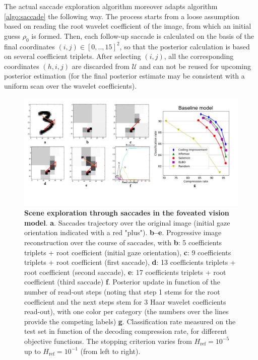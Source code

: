 \documentclass[12pt,twoside,openright]{article}
\begin{document}
The actual saccade exploration algorithm moreover adapts algorithm \ref{algo:saccade} the following way. The process starts from a loose assumption based on reading the root wavelet coefficient of the image, from which an initial guess $\rho_0$ is formed. Then, each follow-up saccade is calculated on the basis of the final coordinates $(i,j) \in [0,..,15]^2$, so that the posterior calculation is based on several coefficient triplets. After selecting $(i,j)$, all the corresponding coordinates $(h,i,j)$ are discarded from $\mathcal{U}$ and can not be reused for upcoming posterior estimation (for the final posterior estimate may be consistent with a uniform scan over the wavelet coefficients). 

\begin{figure}[b!]
	\centerline{
		\includegraphics[width=\linewidth]{img/NIPS-saccade.pdf}}
	\vspace{-.2cm}
	\caption{\textbf{Scene exploration through saccades in the foveated vision model}. \textbf{a}. Saccades trajectory over the original image (initial gaze orientation indicated with a red "plus"). \textbf{b--e}. Progressive image reconstruction over the course of saccades, with \textbf{b}: 5 coefficients triplets + root coefficient (initial gaze orientation), \textbf{c}: 9 coefficients triplets + root coefficient (first saccade), \textbf{d}: 13 coefficients triplets + root coefficient (second saccade), \textbf{e}: 17 coefficients triplets + root coefficient (third saccade) \textbf{f}. Posterior update in function of the number of read-out steps (noting that step 1 stems for the root coefficient and the next steps stem for 3 Haar wavelet coefficients read-out), with one color per category (the numbers over the lines provide the competing labels) \textbf{g}.  Classification rate measured on the test set in function of the decoding compression rate, for different objective functions. The stopping criterion varies from $H_\text{ref}=10^{-5}$ up to  $H_\text{ref}=10^{-1}$ (from left to right).}\label{fig:foveated-saccades}
\end{figure}
\end{document}
